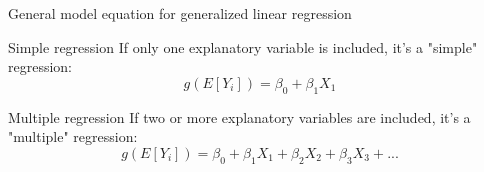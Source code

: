 \documentclass[ignorenonframetext,]{beamer}
\begin{document}
\begin{frame}{General model equation for generalized linear regression}

\begin{block}{Simple regression}
If only one explanatory variable is included, it's a "simple" regression: 
\begin{equation*} 
g(E[Y_i]) = \beta_0 + \beta_1X_1 
\end{equation*}
\end{block}

\begin{block}{Multiple regression}
If two or more explanatory variables are included, it's a "multiple" regression: 
\begin{equation*}
g(E[Y_i]) = \beta_0 + \beta_1X_1 + \beta_2X_2 + \beta_3X_3 + ...
\end{equation*}
\end{block}

\end{frame}
\end{document}

